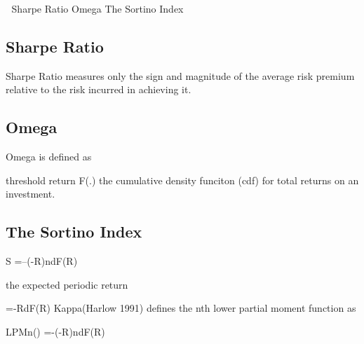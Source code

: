 

Sharpe Ratio
Omega
The Sortino Index

\subsection*{Sharpe Ratio}

Sharpe Ratio measures only the sign and magnitude of the average risk premium relative to the risk incurred in achieving it.
 
 
\subsection*{Omega}

Omega is defined as 



 threshold return
F(.) the cumulative density funciton (cdf) for total returns on an investment.

\subsection*{The Sortino Index}

S =--(-R)ndF(R)

 the expected periodic return

=-RdF(R) 
Kappa(Harlow 1991) defines the nth lower partial moment function as

LPMn() =-(-R)ndF(R)
